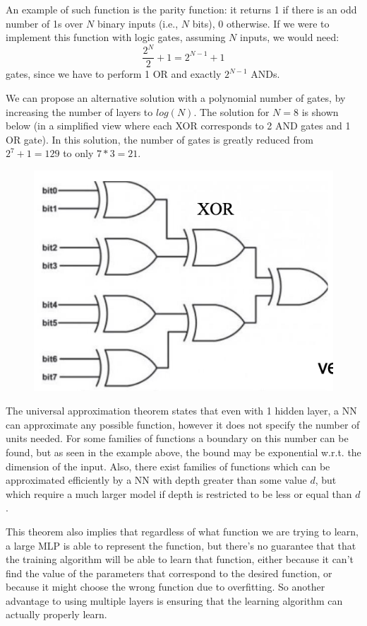 An example of such function is the parity function: it returns 1 if there is an odd number of 1s over $N$ binary inputs (i.e., $N$ bits), 0 otherwise. If we were to implement this function with logic gates, assuming $N$ inputs, we would need:
\begin{equation*}
    \dfrac{2^N}{2} + 1 = 2^{N-1} + 1
\end{equation*}
gates, since we have to perform 1 OR and exactly $2^{N-1}$ ANDs.

We can propose an alternative solution with a polynomial number of gates, by increasing the number of layers to $log(N)$. The solution for $N=8$ is shown below (in a simplified view where each XOR corresponds to 2 AND gates and 1 OR gate). In this solution, the number of gates is greatly reduced from $2^7 + 1 = 129$ to only $7 * 3 = 21$.
\begin{figure}[h]
    \centering
    \includegraphics[width=0.5\linewidth]{img/Circuit_deep.png}
\end{figure}

The universal approximation theorem states that even with 1 hidden layer, a NN can approximate any possible function, however it does not specify the number of units needed. For some families of functions a boundary on this number can be found, but as seen in the example above, the bound may be exponential w.r.t. the dimension of the input. Also, there exist families of functions which can be approximated efficiently by a NN with depth greater than some value $d$, but which require a much larger model if depth is restricted to be less or equal than $d$.

This theorem also implies that regardless of what function we are trying to learn, a large MLP is able to represent the function, but there's no guarantee that that the training algorithm will be able to learn that function, either because it can't find the value of the parameters that correspond to the desired function, or because it might choose the wrong function due to overfitting. So another advantage to using multiple layers is ensuring that the learning algorithm can actually properly learn.

